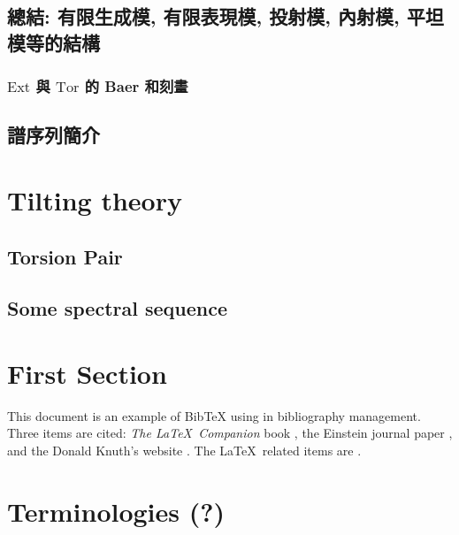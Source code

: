 \documentclass[11pt]{ctexart}
\theoremstyle{definition}
\theoremstyle{definition}
\theoremstyle{remark}
\begin{document}
\subsection{總結: 有限生成模, 有限表現模, 投射模, 內射模, 平坦模等的結構}


\subsubsection{\texorpdfstring{$\mathrm{Ext}$}{PDFstring} 與 \texorpdfstring{$\mathrm{Tor}$}{PDFstring} 的 Baer 和刻畫}
\newpage 


\subsection{譜序列簡介}
\newpage


\section{Tilting theory}

\subsection{Torsion Pair}

\subsection{Some spectral sequence}



\newpage







\section{First Section}
This document is an example of BibTeX using in bibliography management. Three items are cited: \textit{The \LaTeX\ Companion} book \cite{latexcompanion}, the Einstein journal paper \cite{einstein}, and the Donald Knuth's website \cite{knuthwebsite}. The \LaTeX\ related items are \cite{latexcompanion,knuthwebsite}. 
    

\newpage


\section{Terminologies (?)}
\end{document}
